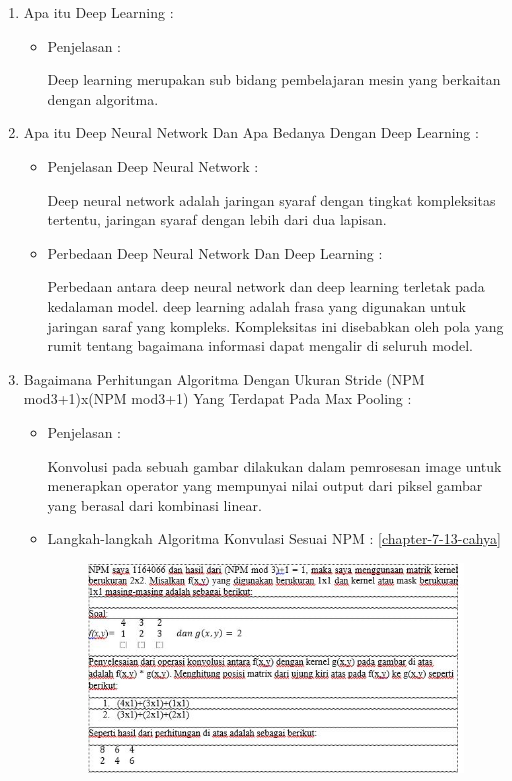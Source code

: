 \begin{enumerate}
\par
\item Apa itu Deep Learning :
\begin{itemize}
\item Penjelasan :
\par Deep learning merupakan sub bidang pembelajaran mesin yang berkaitan dengan algoritma.
\par
\end{itemize}
\item Apa itu Deep Neural Network Dan Apa Bedanya Dengan Deep Learning :
\begin{itemize}
\item Penjelasan Deep Neural Network : 
\par Deep neural network adalah jaringan syaraf dengan tingkat kompleksitas tertentu, jaringan syaraf dengan lebih dari dua lapisan.
\par
\item Perbedaan Deep Neural Network Dan Deep Learning :
\par Perbedaan antara deep neural network dan deep learning terletak pada kedalaman model. deep learning adalah frasa yang digunakan untuk jaringan saraf yang kompleks. Kompleksitas ini disebabkan oleh pola yang rumit tentang bagaimana informasi dapat mengalir di seluruh model.
\par
\par
\end{itemize}
\par
\par
\item Bagaimana Perhitungan Algoritma Dengan Ukuran Stride (NPM mod3+1)x(NPM mod3+1) Yang Terdapat Pada Max Pooling :
\begin{itemize}
\item Penjelasan :
\par Konvolusi pada sebuah gambar dilakukan dalam pemrosesan image untuk menerapkan operator yang mempunyai nilai output dari piksel gambar yang berasal dari kombinasi linear.
\par
\item Langkah-langkah Algoritma Konvulasi Sesuai NPM : \ref{chapter-7-13-cahya}
\par
\par
\begin{figure}[!hbtp]
\centering
\includegraphics[scale=0.52]{figures/Chapter 7/1164066/Teori/chapter-7-13-cahya.jpg}

\end{figure}
\end{itemize}
\end{enumerate}
